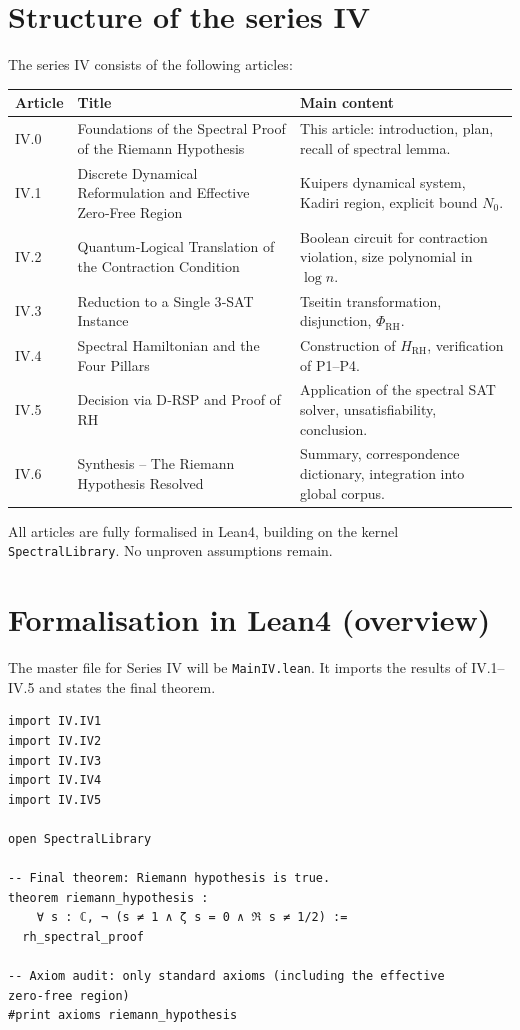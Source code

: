 \documentclass[11pt,a4paper]{article}
\begin{document}
\section{Structure of the series IV}

The series IV consists of the following articles:

\begin{center}
\begin{tabular}{@{}llp{8cm}@{}}
\toprule
\textbf{Article} & \textbf{Title} & \textbf{Main content} \\
\midrule
IV.0 & Foundations of the Spectral Proof of the Riemann Hypothesis & This article: introduction, plan, recall of spectral lemma. \\
IV.1 & Discrete Dynamical Reformulation and Effective Zero‑Free Region & Kuipers dynamical system, Kadiri region, explicit bound \(N_0\). \\
IV.2 & Quantum‑Logical Translation of the Contraction Condition & Boolean circuit for contraction violation, size polynomial in \(\log n\). \\
IV.3 & Reduction to a Single 3‑SAT Instance & Tseitin transformation, disjunction, \(\Phi_{\text{RH}}\). \\
IV.4 & Spectral Hamiltonian and the Four Pillars & Construction of \(H_{\text{RH}}\), verification of P1–P4. \\
IV.5 & Decision via D‑RSP and Proof of RH & Application of the spectral SAT solver, unsatisfiability, conclusion. \\
IV.6 & Synthesis – The Riemann Hypothesis Resolved & Summary, correspondence dictionary, integration into global corpus. \\
\bottomrule
\end{tabular}
\end{center}

All articles are fully formalised in Lean4, building on the kernel \texttt{SpectralLibrary}. No unproven assumptions remain.

\section{Formalisation in Lean4 (overview)}

The master file for Series IV will be \texttt{MainIV.lean}. It imports the results of IV.1–IV.5 and states the final theorem.

\begin{lstlisting}[style=lean, caption={MainIV.lean (sketch)}]
import IV.IV1
import IV.IV2
import IV.IV3
import IV.IV4
import IV.IV5

open SpectralLibrary

-- Final theorem: Riemann hypothesis is true.
theorem riemann_hypothesis :
    ∀ s : ℂ, ¬ (s ≠ 1 ∧ ζ s = 0 ∧ ℜ s ≠ 1/2) :=
  rh_spectral_proof

-- Axiom audit: only standard axioms (including the effective zero‑free region)
#print axioms riemann_hypothesis
\end{lstlisting}
\end{document}

